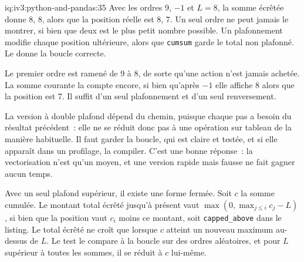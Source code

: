 \begin{solution}{iq:iv3:python-and-pandas:35}
Avec les ordres 9, $-1$ et $L = 8$, la somme écrêtée donne 8, 8, alors que la position réelle est 8, 7. Un seul ordre ne peut jamais le montrer, si bien que deux est le plus petit nombre possible. Un plafonnement modifie chaque position ultérieure, alors que \texttt{cumsum} garde le total non plafonné. Le  donne la boucle correcte.
\label{lst:iv3:pp:position}

Le premier ordre est ramené de 9 à 8, de sorte qu'une action n'est jamais achetée. La somme courante la compte encore, si bien qu'après $-1$ elle affiche 8 alors que la position est 7. Il suffit d'un seul plafonnement et d'un seul renversement.

La version à double plafond dépend du chemin, puisque chaque pas a besoin du résultat précédent~: elle ne se réduit donc pas à une opération sur tableau de la manière habituelle. Il faut garder la boucle, qui est claire et testée, et si elle apparaît dans un profilage, la compiler. C'est une bonne réponse~: la vectorisation n'est qu'un moyen, et une version rapide mais fausse ne fait gagner aucun temps.

Avec un seul plafond supérieur, il existe une forme fermée. Soit $c$ la somme cumulée. Le montant total écrêté jusqu'à présent vaut $\max(0, \max_{j \le i} c_j - L)$, si bien que la position vaut $c_i$ moins ce montant, soit \texttt{capped\_above} dans le listing. Le total écrêté ne croît que lorsque $c$ atteint un nouveau maximum au-dessus de $L$. Le test le compare à la boucle sur des ordres aléatoires, et pour $L$ supérieur à toutes les sommes, il se réduit à $c$ lui-même.

\end{solution}

